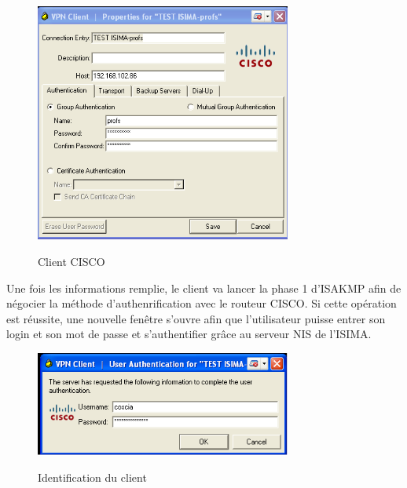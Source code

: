 \begin{figure}[H]
	\begin{center}
		\includegraphics[width=0.75\textwidth]{partie_2/screen_windows/client_cisco.png}\\
	\end{center}
	\caption{Client CISCO}
	\label{VPN_CISCO}
\end{figure}


Une fois les informations remplie, le client va lancer la phase 1 d'ISAKMP afin de négocier la méthode d'authenrification avec le routeur CISCO. Si cette opération est réussite, une nouvelle fenêtre s'ouvre afin que l'utilisateur puisse entrer son login et son mot de passe et s'authentifier grâce au serveur NIS de l'ISIMA.

\begin{figure}[H]
	\begin{center}
		\includegraphics[width=0.75\textwidth]{partie_2/screen_windows/fenetre_connexion.PNG}\\
	\end{center}
	\caption{Identification du client}
	\label{VPN_CISCO_CLIENT}
\end{figure}



